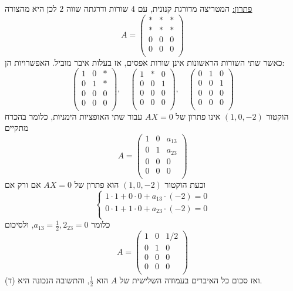 \documentclass[12pt, a4paper]{article}
\begin{document}
\begin{enumerate}
\underline{פתרון:}
המטריצה מדורגת קנונית, עם
$4$
שורות ודרגתה שווה
$2$
לכן היא מהצורה
$$A=
\begin{pmatrix}
*&*&*\\
*&*&*\\
0&0&0\\
0&0&0\\
\end{pmatrix}$$
כאשר שתי השורות הראשונות אינן שורות אפסים, אז בעלות איבר מוביל. האפשרויות הן:
$$
\begin{pmatrix}
1&0&*\\
0&1&*\\
0&0&0\\
0&0&0\\
\end{pmatrix},\quad
\begin{pmatrix}
1&*&0\\
0&0&1\\
0&0&0\\
0&0&0\\
\end{pmatrix},\quad
\begin{pmatrix}
0&1&0\\
0&0&1\\
0&0&0\\
0&0&0\\
\end{pmatrix}$$
הוקטור
$(1,0,-2)$
אינו פתרון של 
$AX=0$
עבור שתי האופציות הימניות, כלומר בהכרח מתקיים
$$A=\begin{pmatrix}
1&0&a_{13}\\
0&1&a_{23}\\
0&0&0\\
0&0&0\\
\end{pmatrix}$$
וכעת הוקטור
$(1,0,-2)$
הוא פתרון של
$AX=0$
אם ורק אם
$$\begin{cases}
1\cdot 1+0\cdot 0+a_{13}\cdot(-2)=0\\
0\cdot 1+1\cdot 0+a_{23}\cdot (-2)=0\\
\end{cases}$$
כלומר
$a_{13}=\frac{1}{2}, 2_{23}=0$,
ולסיכום
$$A=\begin{pmatrix}
1&0&1/2\\
0&1&0\\
0&0&0\\
0&0&0\\
\end{pmatrix}$$
ואז סכום  כל האיברים בעמודה השלישית של
$A$
הוא
$\frac{1}{2}$,
והתשובה הנכונה היא (ד).


\end{enumerate}
\end{document}
